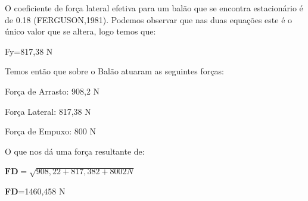 	O coeficiente de força lateral efetiva para um balão que se encontra estacionário é de 0.18 (FERGUSON,1981). Podemos observar que nas duas equações este é o único valor que se altera, logo temos que:

	Fy=817,38 N

	Temos então que sobre o Balão atuaram as seguintes forças:
	
	Força de Arrasto: 908,2 N
	
	Força Lateral: 817,38 N
	
	Força de Empuxo: 800 N 
	
	O que nos dá uma força resultante de:
	
	$\textbf{FD}= \sqrt{908,22+ 817,382+8002N}$ 
	
	\textbf{FD}=1460,458 N


